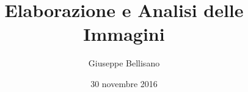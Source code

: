 \documentclass[a4paper,10pt,oneside]{book}
\title{Elaborazione e Analisi delle Immagini}
\author{Giuseppe Bellisano}
\date{30 novembre 2016}
\begin{document}
\maketitle
\tableofcontents 					%





\printindex				%

\printglossaries		%
\end{document}
